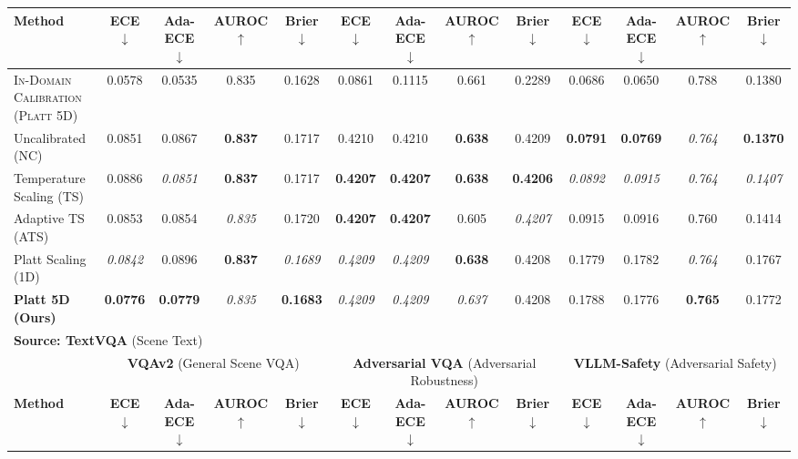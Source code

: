 \begin{table}[t]
{\begin{tabular}{l cccc cccc cccc}
\cmidrule(lr){2-5} \cmidrule(lr){6-9} \cmidrule(lr){10-13}
\textbf{Method} & \textbf{ECE} $\downarrow$ & \textbf{Ada-ECE} $\downarrow$ & \textbf{AUROC} $\uparrow$ & \textbf{Brier} $\downarrow$ & \textbf{ECE} $\downarrow$ & \textbf{Ada-ECE} $\downarrow$ & \textbf{AUROC} $\uparrow$ & \textbf{Brier} $\downarrow$ & \textbf{ECE} $\downarrow$ & \textbf{Ada-ECE} $\downarrow$ & \textbf{AUROC} $\uparrow$ & \textbf{Brier} $\downarrow$ \\
\midrule
\textsc{In-Domain Calibration (Platt 5D)} & 0.0578 & 0.0535 & 0.835 & 0.1628 & 0.0861 & 0.1115 & 0.661 & 0.2289 & 0.0686 & 0.0650 & 0.788 & 0.1380 \\
Uncalibrated (NC) & 0.0851 & 0.0867 & \textbf{0.837} & 0.1717 & 0.4210 & 0.4210 & \textbf{0.638} & 0.4209 & \textbf{0.0791} & \textbf{0.0769} & \textit{0.764} & \textbf{0.1370} \\
Temperature Scaling (TS) & 0.0886 & \textit{0.0851} & \textbf{0.837} & 0.1717 & \textbf{0.4207} & \textbf{0.4207} & \textbf{0.638} & \textbf{0.4206} & \textit{0.0892} & \textit{0.0915} & \textit{0.764} & \textit{0.1407} \\
Adaptive TS (ATS) & 0.0853 & 0.0854 & \textit{0.835} & 0.1720 & \textbf{0.4207} & \textbf{0.4207} & 0.605 & \textit{0.4207} & 0.0915 & 0.0916 & 0.760 & 0.1414 \\
Platt Scaling (1D) & \textit{0.0842} & 0.0896 & \textbf{0.837} & \textit{0.1689} & \textit{0.4209} & \textit{0.4209} & \textbf{0.638} & 0.4208 & 0.1779 & 0.1782 & \textit{0.764} & 0.1767 \\
\textbf{Platt 5D (Ours)} & \textbf{0.0776} & \textbf{0.0779} & \textit{0.835} & \textbf{0.1683} & \textit{0.4209} & \textit{0.4209} & \textit{0.637} & 0.4208 & 0.1788 & 0.1776 & \textbf{0.765} & 0.1772 \\
\midrule
\multicolumn{13}{l}{\textbf{Source: TextVQA} (Scene Text)} \\
\midrule
 & \multicolumn{4}{c}{\textbf{VQAv2} (General Scene VQA)} & \multicolumn{4}{c}{\textbf{Adversarial VQA} (Adversarial Robustness)} & \multicolumn{4}{c}{\textbf{VLLM-Safety} (Adversarial Safety)} \\
\cmidrule(lr){2-5} \cmidrule(lr){6-9} \cmidrule(lr){10-13}
\textbf{Method} & \textbf{ECE} $\downarrow$ & \textbf{Ada-ECE} $\downarrow$ & \textbf{AUROC} $\uparrow$ & \textbf{Brier} $\downarrow$ & \textbf{ECE} $\downarrow$ & \textbf{Ada-ECE} $\downarrow$ & \textbf{AUROC} $\uparrow$ & \textbf{Brier} $\downarrow$ & \textbf{ECE} $\downarrow$ & \textbf{Ada-ECE} $\downarrow$ & \textbf{AUROC} $\uparrow$ & \textbf{Brier} $\downarrow$ \\

\end{tabular}}
\end{table}
